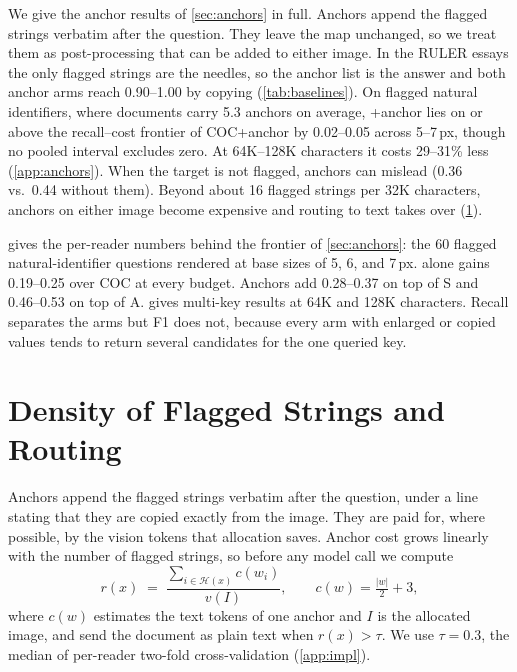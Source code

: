 We give the anchor results of \cref{sec:anchors} in full. Anchors append the flagged strings verbatim after the question. They leave the map unchanged, so we treat them as post-processing that can be added to either image. In the RULER essays the only flagged strings are the needles, so the anchor list is the answer and both anchor arms reach 0.90--1.00 by copying (\cref{tab:baselines}). On flagged natural identifiers, where documents carry 5.3 anchors on average, \name+anchor lies on or above the recall--cost frontier of COC+anchor by 0.02--0.05 across 5--7\,px, though no pooled interval excludes zero. At 64K--128K characters it costs 29--31\% less (\cref{app:anchors}). When the target is not flagged, anchors can mislead (0.36 vs.\ 0.44 without them). Beyond about 16 flagged strings per 32K characters, anchors on either image become expensive and routing to text takes over (\cref{app:density}).

 gives the per-reader numbers behind the frontier of \cref{sec:anchors}: the 60 flagged natural-identifier questions rendered at base sizes of 5, 6, and 7\,px.
\name alone gains 0.19--0.25 over COC at every budget.
Anchors add 0.28--0.37 on top of S and 0.46--0.53 on top of A.
 gives multi-key results at 64K and 128K characters.
Recall separates the arms but F1 does not, because every arm with enlarged or copied values tends to return several candidates for the one queried key.





\section{Density of Flagged Strings and Routing}
\label{app:density}

Anchors append the flagged strings verbatim after the question, under a line stating that they are copied exactly from the image.
They are paid for, where possible, by the vision tokens that allocation saves.
Anchor cost grows linearly with the number of flagged strings, so before any model call we compute
\begin{equation}
  r(x) \;=\; \frac{\sum_{i\in\mathcal{H}(x)} c(w_i)}{v(I)}, \qquad c(w) = \tfrac{|w|}{2} + 3,
  \label{eq:route}
\end{equation}
where $c(w)$ estimates the text tokens of one anchor and $I$ is the allocated image, and send the document as plain text when $r(x)>\tau$.
We use $\tau=0.3$, the median of per-reader two-fold cross-validation (\cref{app:impl}).

